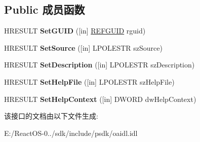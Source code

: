 \subsection*{Public 成员函数}
\begin{DoxyCompactItemize}
\item 
\mbox{\label{interface_i_create_error_info_a55f3a3a27fe935006f0839d2403bea76}} 
H\+R\+E\+S\+U\+LT {\bfseries Set\+G\+U\+ID} (\mbox{[}in\mbox{]} \hyperlink{struct___g_u_i_d}{R\+E\+F\+G\+U\+ID} rguid)
\item 
\mbox{\label{interface_i_create_error_info_a4e289fbd8cd5c2e51392807859215ba4}} 
H\+R\+E\+S\+U\+LT {\bfseries Set\+Source} (\mbox{[}in\mbox{]} L\+P\+O\+L\+E\+S\+TR sz\+Source)
\item 
\mbox{\label{interface_i_create_error_info_a0c1ac0ae24c53e72364e7b5820a479b5}} 
H\+R\+E\+S\+U\+LT {\bfseries Set\+Description} (\mbox{[}in\mbox{]} L\+P\+O\+L\+E\+S\+TR sz\+Description)
\item 
\mbox{\label{interface_i_create_error_info_a4e0146dd818a3c8172f523b0ef820f4d}} 
H\+R\+E\+S\+U\+LT {\bfseries Set\+Help\+File} (\mbox{[}in\mbox{]} L\+P\+O\+L\+E\+S\+TR sz\+Help\+File)
\item 
\mbox{\label{interface_i_create_error_info_ac56718980f6a0fc54c0cb57f8d4f0bea}} 
H\+R\+E\+S\+U\+LT {\bfseries Set\+Help\+Context} (\mbox{[}in\mbox{]} D\+W\+O\+RD dw\+Help\+Context)
\end{DoxyCompactItemize}


该接口的文档由以下文件生成\+:\begin{DoxyCompactItemize}
\item 
E\+:/\+React\+O\+S-\/0../sdk/include/psdk/oaidl.\+idl\end{DoxyCompactItemize}
